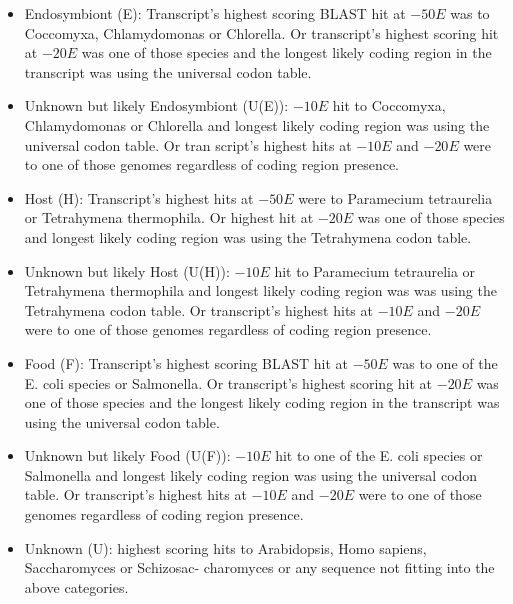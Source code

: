 \begin{itemize}
    \item Endosymbiont (E): Transcript’s highest scoring BLAST hit at \(-50E\) was to Coccomyxa,
        Chlamydomonas or Chlorella. Or transcript’s highest scoring hit at \(-20E\) was one of those
species and the longest likely coding region in the transcript was using the universal codon
table.
\item Unknown but likely Endosymbiont (U(E)): \(-10E\) hit to Coccomyxa, Chlamydomonas or
Chlorella and longest likely coding region was using the universal codon table. Or tran
script’s highest hits at \(-10E\) and \(-20E\) were to one of those genomes regardless of coding
region presence.
\item Host (H): Transcript’s highest hits at \(-50E\) were to Paramecium tetraurelia or Tetrahymena
    thermophila. Or highest hit at \(-20E\) was one of those species and longest likely coding
region was using the Tetrahymena codon table.
\item Unknown but likely Host (U(H)): \(-10E\) hit to Paramecium tetraurelia or Tetrahymena
thermophila and longest likely coding region was was using the Tetrahymena codon table.
Or transcript’s highest hits at \(-10E\) and \(-20E\) were to one of those genomes regardless of
coding region presence.
\item Food (F): Transcript’s highest scoring BLAST hit at \(-50E\) was to one of the E. coli species
    or Salmonella. Or transcript’s highest scoring hit at \(-20E\) was one of those species and
the longest likely coding region in the transcript was using the universal codon table.
\item Unknown but likely Food (U(F)): \(-10E\) hit to one of the E. coli species or Salmonella and
longest likely coding region was using the universal codon table. Or transcript’s highest
hits at \(-10E\) and \(-20E\) were to one of those genomes regardless of coding region presence.
\item Unknown (U): highest scoring hits to Arabidopsis, Homo sapiens, Saccharomyces or Schizosac-
charomyces or any sequence not fitting into the above categories.
\end{itemize}

